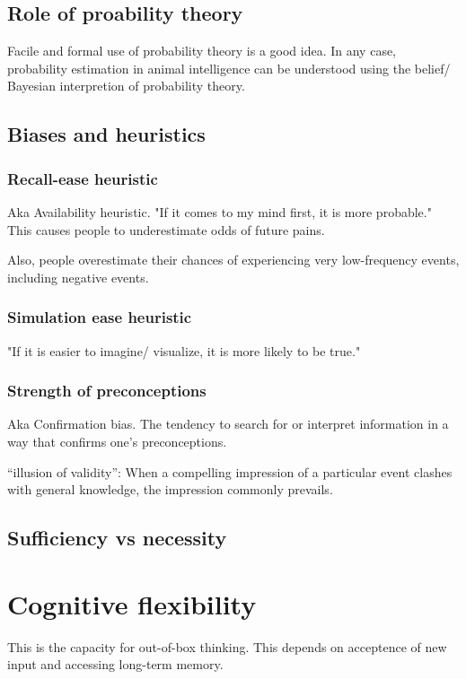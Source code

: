 \documentclass[oneside, article]{memoir}
\begin{document}
\subsection{Role of proability theory}
Facile and formal use of probability theory is a good idea. In any case, probability estimation in animal intelligence can be understood using the belief/ Bayesian interpretion of probability theory.


\subsection{Biases and heuristics}
\subsubsection{Recall-ease heuristic}
Aka Availability heuristic. "If it comes to my mind first, it is more probable." This causes people to underestimate odds of future pains.

Also, people overestimate their chances of experiencing very low-frequency events, including negative events.

\subsubsection{Simulation ease heuristic}
"If it is easier to imagine/ visualize, it is more likely to be true."

\subsubsection{Strength of preconceptions}
Aka Confirmation bias. The tendency to search for or interpret information in a way that confirms one's preconceptions.

“illusion of validity”: When a compelling impression of a particular event clashes with general knowledge, the impression commonly prevails.

\subsection{Sufficiency vs necessity}

\section{Cognitive flexibility}
This is the capacity for out-of-box thinking. This depends on acceptence of new input and accessing long-term memory.
\end{document}
